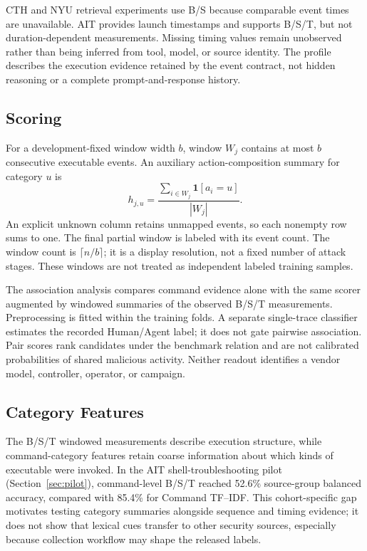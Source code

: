 \documentclass[10pt]{article}
\newcommand{\ind}{\mathbf{1}}
\begin{document}
CTH and NYU retrieval experiments use B/S because comparable event times are unavailable. AIT provides launch timestamps and supports B/S/T, but not duration-dependent measurements. Missing timing values remain unobserved rather than being inferred from tool, model, or source identity. The profile describes the execution evidence retained by the event contract, not hidden reasoning or a complete prompt-and-response history.

\subsection{Scoring}
For a development-fixed window width $b$, window $W_j$ contains at most $b$ consecutive executable events. An auxiliary action-composition summary for category $u$ is
\begin{equation}
 h_{j,u}=\frac{\sum_{i\in W_j}\ind[a_i=u]}{|W_j|}.
\end{equation}
An explicit unknown column retains unmapped events, so each nonempty row sums to one. The final partial window is labeled with its event count. The window count is $\lceil n/b\rceil$; it is a display resolution, not a fixed number of attack stages. These windows are not treated as independent labeled training samples.

The association analysis compares command evidence alone with the same scorer augmented by windowed summaries of the observed B/S/T measurements. Preprocessing is fitted within the training folds. A separate single-trace classifier estimates the recorded Human/Agent label; it does not gate pairwise association. Pair scores rank candidates under the benchmark relation and are not calibrated probabilities of shared malicious activity. Neither readout identifies a vendor model, controller, operator, or campaign.

\subsection{Category Features}
\label{subsec:category_extension}
The B/S/T windowed measurements describe execution structure, while command-category features retain coarse information about which kinds of executable were invoked. In the AIT shell-troubleshooting pilot (Section~\ref{sec:pilot}), command-level B/S/T reached 52.6\% source-group balanced accuracy, compared with 85.4\% for Command TF--IDF. This cohort-specific gap motivates testing category summaries alongside sequence and timing evidence; it does not show that lexical cues transfer to other security sources, especially because collection workflow may shape the released labels.
\end{document}
